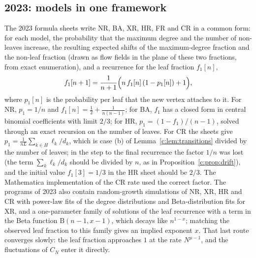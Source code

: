 \documentclass[11pt]{article}
\theoremstyle{plain}
\theoremstyle{definition}
\theoremstyle{remark}
\begin{document}
\subsection*{2023: models in one framework}
The 2023 formula sheets write NR, BA, XR, HR, FR and CR in a common form: for each model, the probability that the maximum degree and the number of non-leaves increase, the resulting expected shifts of the maximum-degree fraction and the non-leaf fraction (drawn as flow fields in the plane of these two fractions, from exact enumeration), and a recurrence for the leaf fraction $f_1[n]$,
\[
f_1[n+1]=\frac{1}{n+1}\Bigl(n\,f_1[n]\,(1-p_1[n])+1\Bigr),
\]
where $p_1[n]$ is the probability per leaf that the new vertex attaches to it. For NR, $p_1=1/n$ and $f_1[n]=\frac12+\frac{1}{n(n-1)}$; for BA, $f_1$ has a closed form in central binomial coefficients with limit $2/3$; for HR, $p_1=(1-f_1)/(n-1)$, solved through an exact recursion on the number of leaves. For CR the sheets give $p_1=\frac{1}{nL}\sum_{k\in H}\ell_k/d_k$, which is case (b) of Lemma~\ref{c:lem:transitions} divided by the number of leaves; in the step to the final recurrence the factor $1/n$ was lost (the term $\sum_k\ell_k/d_k$ should be divided by $n$, as in Proposition~\ref{c:prop:drift}), and the initial value $f_1[3]=1/3$ in the HR sheet should be $2/3$. The Mathematica implementation of the CR rate used the correct factor. The programs of 2023 also contain random-growth simulations of NR, XR, HR and CR with power-law fits of the degree distributions and Beta-distribution fits for XR, and a one-parameter family of solutions of the leaf recurrence with a term in the Beta function $\mathrm{B}(n-1,x-1)$, which decays like $n^{1-x}$; matching the observed leaf fraction to this family gives an implied exponent $x$. That last route converges slowly: the leaf fraction approaches $1$ at the rate $N^{\mu-1}$, and the fluctuations of $C_N$ enter it directly.
\end{document}
